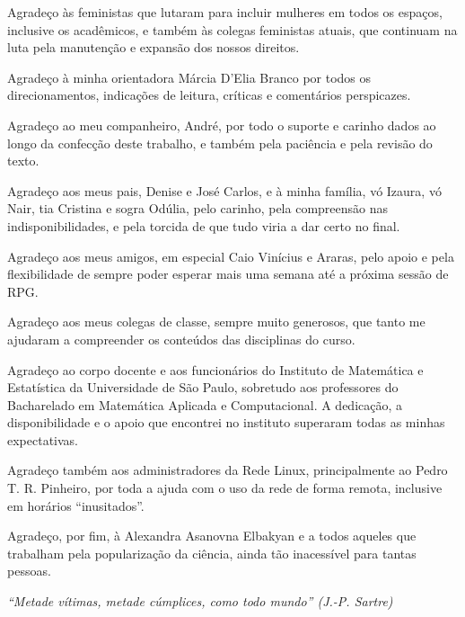\documentclass[
	12pt,				%
	openright,			%
	twoside,			%
	a4paper,			%
	english,			%
	brazil				%
	]{abntex2}
\begin{document}
\begin{agradecimentos}
Agradeço às feministas que lutaram para incluir mulheres em todos os espaços, inclusive os acadêmicos, e também às colegas feministas atuais, que continuam na luta pela manutenção e expansão dos nossos direitos.

Agradeço à minha orientadora Márcia D'Elia Branco por todos os direcionamentos, indicações de leitura, críticas e comentários perspicazes.

Agradeço ao meu companheiro, André, por todo o suporte e carinho dados ao longo da confecção deste trabalho, e também pela paciência e pela revisão do texto.

Agradeço aos meus pais, Denise e José Carlos, e à minha família, vó Izaura, vó Nair, tia Cristina e sogra Odúlia, pelo carinho, pela compreensão nas indisponibilidades, e pela torcida de que tudo viria a dar certo no final.

Agradeço aos meus amigos, em especial Caio Vinícius e Araras, pelo apoio e pela flexibilidade de sempre poder esperar mais uma semana até a próxima sessão de RPG.

Agradeço aos meus colegas de classe, sempre muito generosos, que tanto me ajudaram a compreender os conteúdos das disciplinas do curso.

Agradeço ao corpo docente e aos funcionários do Instituto de Matemática e Estatística da Universidade de São Paulo, sobretudo aos professores do Bacharelado em Matemática Aplicada e Computacional. A dedicação, a disponibilidade e o apoio que encontrei no instituto superaram todas as minhas expectativas.

Agradeço também aos administradores da Rede Linux, principalmente ao Pedro T. R. Pinheiro, por toda a ajuda com o uso da rede de forma remota, inclusive em horários ``inusitados''.

Agradeço, por fim, à Alexandra Asanovna Elbakyan e a todos aqueles que trabalham pela popularização da ciência, ainda tão inacessível para tantas pessoas.
\end{agradecimentos}

\begin{epigrafe}
    \vspace*{\fill}
	\begin{flushright}
		\textit{``Metade vítimas, metade cúmplices, como todo mundo''
		(J.-P. Sartre)}
	\end{flushright}
\end{epigrafe}
\end{document}
